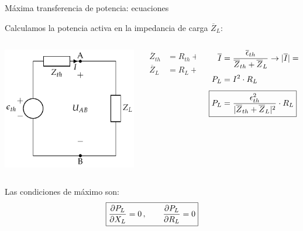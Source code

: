 \documentclass[aspectratio=169, usenames,svgnames,dvipsnames]{beamer}
\begin{document}
\begin{frame}{Máxima transferencia de potencia: \hspace{3mm}ecuaciones}

    \vspace{2mm}
    Calculamos la \alert{potencia activa en la impedancia} de carga \(\overline{Z}_L\):
    \begin{columns}
    \begin{column}{0.3\columnwidth}
    \begin{center}
        \includegraphics[height=0.45\textheight]{../figs/EquivalenteThevenin0.pdf}
    \end{center}
    \end{column}
    
    \begin{column}{0.2\columnwidth}
    \begin{align*}
      \overline{Z}_{th} &= R_{th} + jX_{th}\\[3pt]
      \overline{Z}_L &= R_L + jX_L\\
    \end{align*}
    \end{column}
    
    \begin{column}{0.4\columnwidth}
    \begin{align*}
        \overline{I} &= \frac{\overline{\epsilon}_{th}}{\overline{Z}_{th} + \overline{Z}_L}
        \rightarrow 
        |\overline{I}| = \frac{\epsilon_{th}}{|\overline{Z}_{th} + \overline{Z}_L|}\\[3pt]
        P_L &= I^2 \cdot R_L\\[3pt]
        \Aboxed{P_L &= \frac{\epsilon^2_{th}}{|\overline{Z}_{th} + \overline{Z}_L|^2} \cdot R_L}
    \end{align*}
    \end{column}
    \end{columns}

    \vspace{5mm}
    Las condiciones de máximo son: 
    \[
      \boxed{%
        \diffp{P_L}{X_L} = 0 \, , \qquad%
        \diffp{P_L}{R_L} = 0%
      }
    \]
\end{frame}
\end{document}
